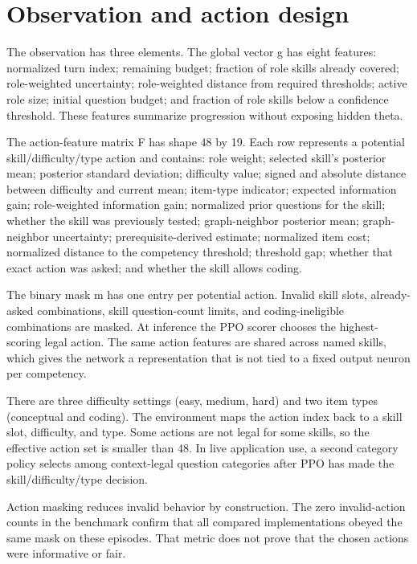 \documentclass{ieeeaccess}
\begin{document}
\section{Observation and action design}

The observation has three elements. The global vector g has eight features: normalized turn index; remaining budget; fraction of role skills already covered; role-weighted uncertainty; role-weighted distance from required thresholds; active role size; initial question budget; and fraction of role skills below a confidence threshold. These features summarize progression without exposing hidden theta.

The action-feature matrix F has shape 48 by 19. Each row represents a potential skill/difficulty/type action and contains: role weight; selected skill's posterior mean; posterior standard deviation; difficulty value; signed and absolute distance between difficulty and current mean; item-type indicator; expected information gain; role-weighted information gain; normalized prior questions for the skill; whether the skill was previously tested; graph-neighbor posterior mean; graph-neighbor uncertainty; prerequisite-derived estimate; normalized item cost; normalized distance to the competency threshold; threshold gap; whether that exact action was asked; and whether the skill allows coding.

The binary mask m has one entry per potential action. Invalid skill slots, already-asked combinations, skill question-count limits, and coding-ineligible combinations are masked. At inference the PPO scorer chooses the highest-scoring legal action. The same action features are shared across named skills, which gives the network a representation that is not tied to a fixed output neuron per competency.

There are three difficulty settings (easy, medium, hard) and two item types (conceptual and coding). The environment maps the action index back to a skill slot, difficulty, and type. Some actions are not legal for some skills, so the effective action set is smaller than 48. In live application use, a second category policy selects among context-legal question categories after PPO has made the skill/difficulty/type decision.

Action masking reduces invalid behavior by construction. The zero invalid-action counts in the benchmark confirm that all compared implementations obeyed the same mask on these episodes. That metric does not prove that the chosen actions were informative or fair.
\end{document}
